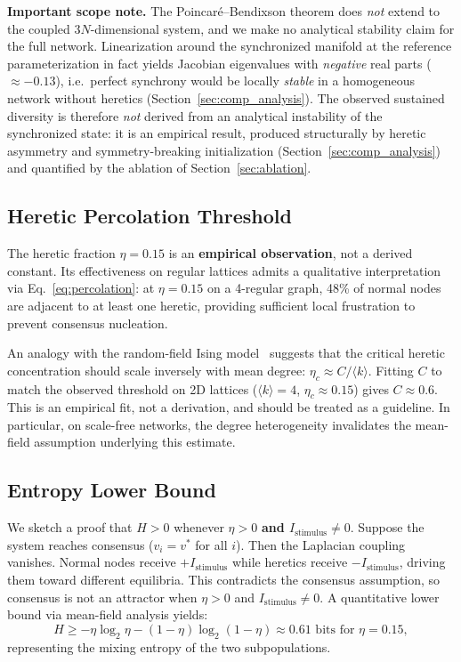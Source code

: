 ﻿\documentclass[11pt]{article}
\begin{document}
\textbf{Important scope note.} The Poincar\'e--Bendixson theorem does \emph{not} extend to the coupled $3N$-dimensional system, and we make no analytical stability claim for the full network. Linearization around the synchronized manifold at the reference parameterization in fact yields Jacobian eigenvalues with \emph{negative} real parts ($\approx -0.13$), i.e.\ perfect synchrony would be locally \emph{stable} in a homogeneous network without heretics (Section~\ref{sec:comp_analysis}). The observed sustained diversity is therefore \emph{not} derived from an analytical instability of the synchronized state: it is an empirical result, produced structurally by heretic asymmetry and symmetry-breaking initialization (Section~\ref{sec:comp_analysis}) and quantified by the ablation of Section~\ref{sec:ablation}.


\subsection{Heretic Percolation Threshold}

The heretic fraction $\eta = 0.15$ is an \textbf{empirical observation}, not a derived constant. Its effectiveness on regular lattices admits a qualitative interpretation via Eq.~\ref{eq:percolation}: at $\eta = 0.15$ on a 4-regular graph, 48\% of normal nodes are adjacent to at least one heretic, providing sufficient local frustration to prevent consensus nucleation.

An analogy with the random-field Ising model~\cite{nattermann1998} suggests that the critical heretic concentration should scale inversely with mean degree: $\eta_c \approx C / \langle k \rangle$. Fitting $C$ to match the observed threshold on 2D lattices ($\langle k \rangle = 4$, $\eta_c \approx 0.15$) gives $C \approx 0.6$. This is an empirical fit, not a derivation, and should be treated as a guideline. In particular, on scale-free networks, the degree heterogeneity invalidates the mean-field assumption underlying this estimate.

\subsection{Entropy Lower Bound}

We sketch a proof that $H > 0$ whenever $\eta > 0$ \textbf{and $I_{\text{stimulus}} \neq 0$}. Suppose the system reaches consensus ($v_i = v^*$ for all $i$). Then the Laplacian coupling vanishes. Normal nodes receive $+I_{\text{stimulus}}$ while heretics receive $-I_{\text{stimulus}}$, driving them toward different equilibria. This contradicts the consensus assumption, so consensus is not an attractor when $\eta > 0$ and $I_{\text{stimulus}} \neq 0$. A quantitative lower bound via mean-field analysis yields:
\begin{equation}
H \geq -\eta \log_2 \eta - (1 - \eta) \log_2(1 - \eta) \approx 0.61 \text{ bits for } \eta = 0.15,
\label{eq:entropy_bound}
\end{equation}
representing the mixing entropy of the two subpopulations.
\end{document}

